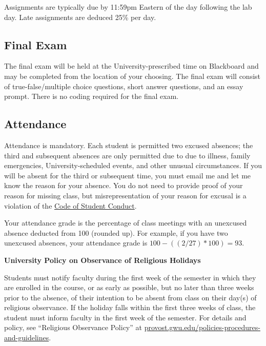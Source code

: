 \documentclass[12pt,letterpaper]{article}
\begin{document}
Assignments are typically due by 11:59pm Eastern of the day following
the lab day. Late assignments are deduced 25\% per day. \par

\subsection*{Final Exam}

The final exam will be held at the University-prescribed time on
Blackboard and may be completed from the location of your choosing.
The final exam will consist of true-false/multiple choice questions,
short answer questions, and an essay prompt. There is no coding
required for the final exam.

\subsection*{Attendance}

Attendance is mandatory. Each student is permitted two excused
absences; the third and subsequent absences are only permitted due to
due to illness, family emergencies, University-scheduled events, and
other unusual circumstances. If you will be absent for the third or
subsequent time, you must email me and let me know the reason for
your absence. You do not need to provide proof of your reason for
missing class, but misrepresentation of your reason for excusal is a
violation of the
\href{https://students.gwu.edu/code-student-conduct}{Code of Student
Conduct}. \par

Your attendance grade is the percentage of class meetings with an
unexcused absence deducted from 100 (rounded up). For example, if you
have two unexcused absences, your attendance grade is
$100-((2/27)*100) = 93$. \par

\textbf{University Policy on Observance of Religious Holidays} \par

Students must notify faculty during the first week of the semester in
which they are enrolled in the course, or as early as possible, but
no later than three weeks prior to the absence, of their intention to
be absent from class on their day(s) of religious observance. If the
holiday falls within the first three weeks of class, the student must
inform faculty in the first week of the semester. For details and
policy, see ``Religious Observance Policy'' at
\href{https://provost.gwu.edu/policies-procedures-and-guidelines}{provost.gwu.edu/policies-procedures-and-guidelines}.
\end{document}
